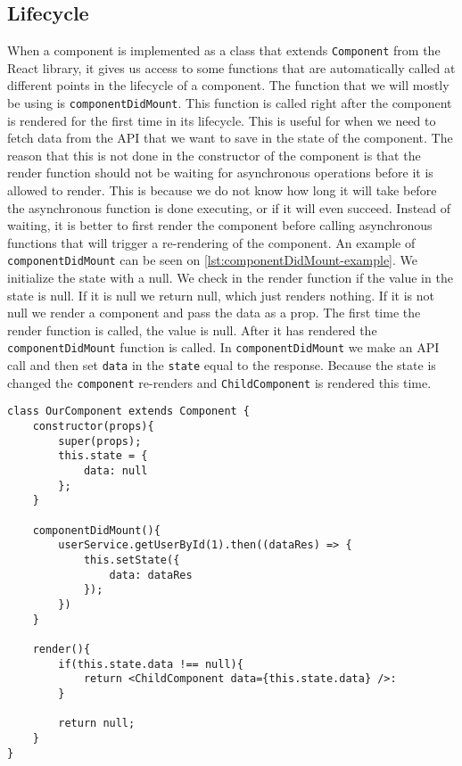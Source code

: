 \subsection*{Lifecycle}
When a component is implemented as a class that extends \texttt{Component} from the React library, it gives us access to some functions that are automatically called at different points in the lifecycle of a component.
The function that we will mostly be using is \texttt{componentDidMount}.
This function is called right after the component is rendered for the first time in its lifecycle.
This is useful for when we need to fetch data from the API that we want to save in the state of the component.
The reason that this is not done in the constructor of the component is that the render function should not be waiting for asynchronous operations before it is allowed to render.
This is because we do not know how long it will take before the asynchronous function is done executing, or if it will even succeed.
Instead of waiting, it is better to first render the component before calling asynchronous functions that will trigger a re-rendering of the component.
An example of \texttt{componentDidMount} can be seen on \autoref{lst:componentDidMount-example}.
We initialize the state with a null.
We check in the render function if the value in the state is null.
If it is null we return null, which just renders nothing.
If it is not null we render a component and pass the data as a prop.
The first time the render function is called, the value is null.
After it has rendered the \texttt{componentDidMount} function is called.
In \texttt{componentDidMount} we make an API call and then set \texttt{data} in the \texttt{state} equal to the response.
Because the state is changed the \texttt{component} re-renders and \texttt{ChildComponent} is rendered this time.

\begin{lstlisting}[caption={Example with the componentDidMount function}, label={lst:componentDidMount-example}]
class OurComponent extends Component {
	constructor(props){
		super(props);
		this.state = {
			data: null
		};
	}

	componentDidMount(){
		userService.getUserById(1).then((dataRes) => {
			this.setState({
				data: dataRes
			});
		})
	}

	render(){
		if(this.state.data !== null){
			return <ChildComponent data={this.state.data} />:
		}
			
		return null;
	}
}
\end{lstlisting}
